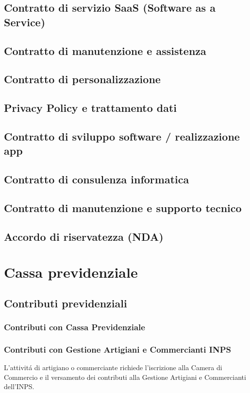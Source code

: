 \documentclass{article}
\begin{document}
\subsection{Contratto di servizio SaaS (Software as a Service)}
\subsection{Contratto di manutenzione e assistenza}
\subsection{Contratto di personalizzazione}
\subsection{Privacy Policy e trattamento dati}

\subsection{Contratto di sviluppo software / realizzazione app}
\subsection{Contratto di consulenza informatica}
\subsection{Contratto di manutenzione e supporto tecnico}
\subsection{Accordo di riservatezza (NDA)}


\section{Cassa previdenziale}
\subsection{Contributi previdenziali}
\subsubsection{Contributi con Cassa Previdenziale}

\subsubsection{Contributi con Gestione Artigiani e Commercianti INPS}
L'attivit\'a di artigiano o commerciante richiede l'iscrizione alla Camera di Commercio e il versamento dei contributi alla Gestione Artigiani e Commercianti dell'INPS. 
\end{document}
